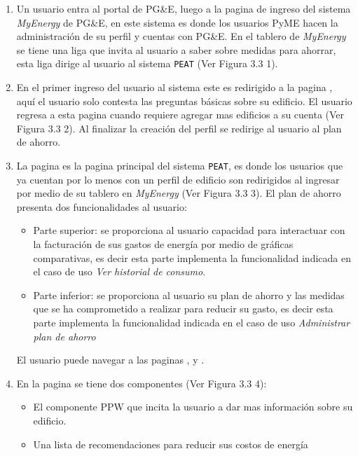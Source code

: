 \begin{enumerate}
\item Un usuario entra al portal de PG\&E, luego a la pagina de ingreso del
  sistema \textit{MyEnergy} de PG\&E, en este sistema es donde los usuarios PyME
  hacen la administración de su perfil y cuentas con PG\&E. En el tablero de
  \textit{MyEnergy} se tiene una liga que invita al usuario a saber sobre
  medidas para ahorrar, esta liga dirige al usuario al sistema \texttt{PEAT}
  (Ver Figura 3.3 1).
\item En el primer ingreso del usuario al sistema este es redirigido a la pagina
  , aquí el usuario solo contesta las preguntas
  básicas sobre su edificio. El usuario regresa a esta pagina cuando requiere
  agregar mas edificios a su cuenta (Ver Figura 3.3 2). Al finalizar la creación
  del perfil se redirige al usuario al plan de ahorro.
\item La pagina  es la pagina principal del sistema
  \texttt{PEAT}, es donde los usuarios que ya cuentan por lo menos con un perfil
  de edificio son redirigidos al ingresar por medio de su tablero en
  \textit{MyEnergy} (Ver Figura 3.3 3).
  El plan de ahorro presenta dos funcionalidades al usuario:
  \begin{itemize}
  \item Parte superior: se proporciona al usuario capacidad para interactuar
    con la facturación de sus gastos de energía por medio de gráficas comparativas,
    es decir esta parte implementa la funcionalidad indicada en el caso de uso
    \textit{Ver historial de consumo}.
  \item Parte inferior: se proporciona al usuario su plan de ahorro y las
    medidas que se ha comprometido a realizar para reducir su gasto, es decir
    esta parte implementa la funcionalidad indicada en el caso de uso
    \textit{Administrar plan de ahorro}
  \end{itemize}
  El usuario puede navegar a las paginas ,
   y .
\item En la pagina  se tiene dos componentes
  (Ver Figura 3.3 4):
  \begin{itemize}
  \item El componente PPW que incita la usuario a dar mas información
    sobre su edificio.
  \item Una lista de recomendaciones para reducir sus costos de energía

\end{itemize}
\end{enumerate}
